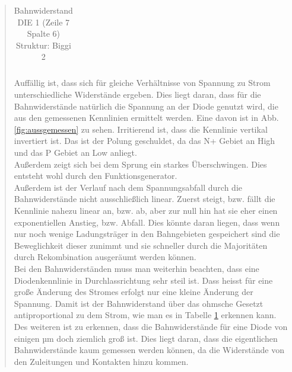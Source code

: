 \begin{quote}
\begin{table}[H]
\begin{addmargin}[3cm]{3cm}
\begin{tabular}{|p{3cm}|p{3cm}|p{3cm}|}
                    \end{tabular}
              \end{addmargin}
              \caption{Bahnwiderstand DIE 1 (Zeile 7 Spalte 6) Struktur: Biggi 2}
              \label{tab:bahnwid}
            \end{table}

    \vspace{2em}

	Auffällig ist, dass sich für gleiche Verhältnisse von Spannung zu Strom
	unterschiedliche Widerstände ergeben. Dies liegt daran, dass für die
	Bahnwiderstände natürlich die Spannung an der Diode genutzt wird, die aus
	den gemessenen Kennlinien ermittelt werden. Eine davon ist in Abb.
	\ref{fig:aussgemessen} zu sehen. Irritierend ist, dass die Kennlinie
	vertikal invertiert ist. Das ist der Polung geschuldet, da das N+ Gebiet an
	High und das P Gebiet an Low anliegt.\\
	Außerdem zeigt sich bei dem Sprung ein starkes Überschwingen. Dies entsteht
	wohl durch den Funktionsgenerator.\\
	Außerdem ist der Verlauf nach dem Spannungsabfall durch die Bahnwiderstände
	nicht ausschließlich linear. Zuerst steigt, bzw. fällt die Kennlinie nahezu
	linear an, bzw. ab, aber zur null hin hat sie eher einen exponentiellen Anstieg, bzw.
	Abfall. Dies könnte daran liegen, dass wenn nur noch wenige Ladungsträger
	in den Bahngebieten gespeichert sind die Beweglichkeit dieser zunimmt und
	sie schneller durch die Majoritäten durch Rekombination ausgeräumt werden
	können.\\
	Bei den Bahnwiderständen muss man weiterhin beachten, dass eine
	Diodenkennlinie in Durchlassrichtung sehr steil ist. Dass heisst für eine
	große Änderung des Stromes erfolgt nur eine kleine Änderung der Spannung.
	Damit ist der Bahnwiderstand über das ohmsche Gesetzt antiproportional zu
	dem Strom, wie man es in Tabelle \ref{tab:bahnwid} erkennen kann.\\
	Des weiteren ist zu erkennen, dass die Bahnwiderstände für eine Diode von
	einigen µm doch ziemlich groß ist. Dies liegt daran, dass die eigentlichen
	Bahnwiderstände kaum gemessen werden können, da die Widerstände von den
	Zuleitungen und Kontakten hinzu kommen.

	\vspace{2em}


\end{quote}

